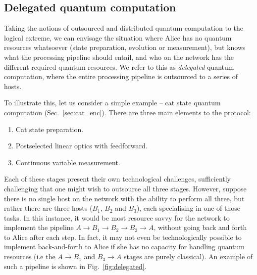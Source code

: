 \documentclass[aps,rmp,twocolumn,amsmath,amssymb,nofootinbib,superscriptaddress,longbibliography,floatfix]{revtex4-1}
\begin{document}
%
%

\subsection{Delegated quantum computation}

Taking the notions of outsourced and distributed quantum computation to the logical extreme, we can envisage the situation where Alice has no quantum resources whatsoever (state preparation, evolution or measurement), but knows what the processing pipeline should entail, and who on the network has the different required quantum resources. We refer to this as \emph{delegated} quantum computation, where the entire processing pipeline is outsourced to a series of hosts.

To illustrate this, let us consider a simple example -- cat state quantum computation (Sec.~\ref{sec:cat_enc}). There are three main elements to the protocol:
\begin{enumerate}
\item Cat state preparation.
\item Postselected linear optics with feedforward.
\item Continuous variable measurement.
\end{enumerate}

Each of these stages present their own technological challenges, sufficiently challenging that one might wish to outsource all three stages. However, suppose there is no single host on the network with the ability to perform all three, but rather there are three hosts ($B_1$, $B_2$ and $B_3$), each specialising in one of those tasks. In this instance, it would be most resource savvy for the network to implement the pipeline \mbox{$A\to B_1\to B_2\to B_3\to A$}, without going back and forth to Alice after each step. In fact, it may not even be technologically possible to implement back-and-forth to Alice if she has no capacity for handling quantum resources (i.e the \mbox{$A\to B_1$} and \mbox{$B_3\to A$} stages are purely classical). An example of such a pipeline is shown in Fig.~\ref{fig:delegated}.
\end{document}
